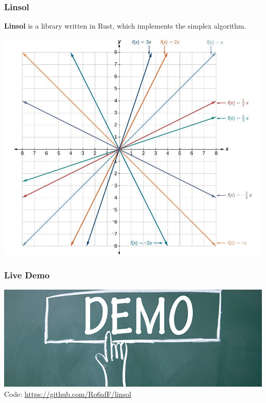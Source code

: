 \documentclass[12pt]{beamer}
\begin{document}
	\begin{frame}
		\frametitle{Linsol}
		\textbf{Linsol} is a library written in Rust, which implements the simplex algorithm.\\
		\begin{center}
			\includegraphics[scale=0.2]{graphs}
		\end{center}
	\end{frame}

	\begin{frame}
		\frametitle{Live Demo}
		\includegraphics[scale=0.47]{demo}\\
		\small{Code: \href{https://github.com/Ro6afF/linsol}{https://github.com/Ro6afF/linsol}}
	\end{frame}
\end{document}
